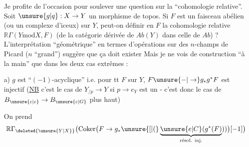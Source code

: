 
Je profite de l'occasion pour soulever une question sur la ``cohomologie relative''. Soit $\unsure{g|q}:X\to Y$ un morphisme de topos. Si $F$ est un faisceau abélien (ou un complexe d'iceux) sur $Y$, peut-on définir  en $F$ la cohomologie relative $\mathbb R\Gamma(Y\mathbin{\mathrm{mod}}X,F)$ (de la catégorie dérivée de $\mathit{Ab}(Y)$ dans celle de $\mathit{Ab}$) ? L'interprétation ``géométrique'' en termes d'opérations sur des $n$-champs de Picard ($n$ ``grand'') suggère que ça doit exister
Mais je ne vois de construction  ``à la main'' que dans les deux cas extrêmes :

a) $g$ est ``$(-1)$-acyclique'' i.e. pour tt $F$ sur $Y$, $F\unsure{\mathord{-}|\to}g_{*}g^{*}F$ est injectif (\uline{NB} c'est le cas de $Y_{/p}\to Y$ si $p\to e_{Y}$ est un  - c'est donc le cas de $B_{\unsure{c|e}}\to B_{\unsure{c|G}}$ plus haut)

On prend
\[
\mathbb R\Gamma_{\deleted{\unsure{Y|X}}}\bigl(\operatorname{Coker}\bigl(F\to g_{*}\unsure{[|(}\underbrace{\unsure{e|C}(g^{*}(F)}_{\text{résol. inj.}}))\bigr)[-1]\bigr)
\]
